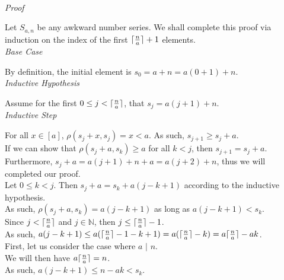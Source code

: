 \documentclass[a4paper,12pt]{article}
\DeclarePairedDelimiter{\ceil}{\lceil}{\rceil}
\begin{document}
\noindent \\
\textit{Proof}

\noindent Let $S_{a,n}$ be any awkward number series. We shall complete this proof via induction on the index of the first $\ceil{\frac{n}{a}} + 1$ elements.\\


\noindent
\textit{Base Case}

\noindent By definition, the initial element is $s_0 = a + n = a(0 + 1) + n$.\\


\noindent
\textit{Inductive Hypothesis}

\noindent Assume for the first $0 \leq j < \ceil{\frac{n}{a}}$, that $s_j = a(j + 1) + n$.\\


\noindent
\textit{Inductive Step}

\noindent For all $x \in [a]$, $\rho(s_j + x, s_j) = x < a$. As such, $s_{j+1} \geq s_j + a$.\\

\noindent If we can show that $\rho(s_j + a, s_k) \geq a$ for all $k < j$, then $s_{j+1} = s_j + a$.\\

\noindent Furthermore, $s_j + a = a(j + 1) + n + a = a(j + 2) + n$, thus we will completed our proof.\\

\noindent Let $0 \leq k < j$. Then $s_j + a = s_k + a(j - k + 1)$ according to the inductive hypothesis.\\

\noindent As such, $\rho(s_j + a, s_k) = a(j - k + 1)$ as long as $a(j - k + 1) < s_k$.\\

\noindent Since $j < \ceil{\frac{n}{a}}$ and $j \in \mathbb{N}$, then $j \leq \ceil{\frac{n}{a}} - 1$.\\

\noindent As such, $a(j - k + 1) \leq a(\ceil{\frac{n}{a}} - 1 - k + 1) = a(\ceil{\frac{n}{a}} - k) = a\ceil{\frac{n}{a}} - ak$.\\

\noindent First, let us consider the case where $a$ $|$ $n$.\\

\noindent We will then have $a \ceil{\frac{n}{a}} = n$.\\

\noindent As such, $a(j - k + 1) \leq n - ak < s_k$.\\
\end{document}
